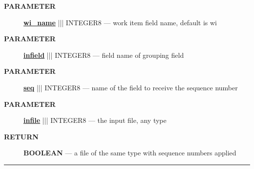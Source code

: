 \par
\begin{description}
\item [\colorbox{tagtype}{\color{white} \textbf{\textsf{PARAMETER}}}] \textbf{\underline{wi\_name}} ||| INTEGER8 --- work item field name, default is wi
\item [\colorbox{tagtype}{\color{white} \textbf{\textsf{PARAMETER}}}] \textbf{\underline{infield}} ||| INTEGER8 --- field name of grouping field
\item [\colorbox{tagtype}{\color{white} \textbf{\textsf{PARAMETER}}}] \textbf{\underline{seq}} ||| INTEGER8 --- name of the field to receive the sequence number
\item [\colorbox{tagtype}{\color{white} \textbf{\textsf{PARAMETER}}}] \textbf{\underline{infile}} ||| INTEGER8 --- the input file, any type
\end{description}







\par
\begin{description}
\item [\colorbox{tagtype}{\color{white} \textbf{\textsf{RETURN}}}] \textbf{BOOLEAN} --- a file of the same type with sequence numbers applied
\end{description}




\rule{\linewidth}{0.5pt}

